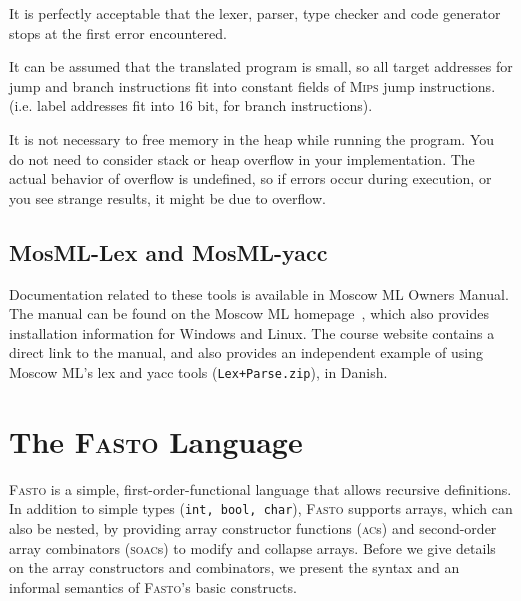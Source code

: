 \documentclass[a4paper,11pt]{article}
\newcommand{\fasto}{\textsc{Fasto}\xspace}
\newcommand{\mips}{\textsc{Mips}\xspace}
\begin{document}
It is perfectly acceptable that the lexer, parser, type checker and code 
generator stops at the first error encountered.

It can be assumed that the translated program is small, so all target addresses 
for jump and branch instructions fit into constant fields of \mips jump instructions.
(i.e. label addresses fit into 16 bit, for branch instructions).

It is not necessary to free memory in the heap while running the program.
You do not need to consider stack or heap overflow in your implementation. 
The actual behavior of overflow is undefined, so if errors occur during execution,
or you see strange results, it might be due to overflow.




\subsection{MosML-Lex and MosML-yacc}

Documentation related to these tools is available in Moscow ML Owners Manual.
The manual can be found on the Moscow ML homepage~\cite{MoscowML}, which 
also provides installation information for Windows and Linux. 
The course website contains a direct link to the manual, and also provides
an independent example of using Moscow ML's lex and yacc tools 
({\tt Lex+Parse.zip}), in Danish. 

\section{The \fasto Language\label{fasto}}
\fasto is a simple, first-order-functional language that allows
recursive definitions. In addition to simple types (\texttt{int, bool, char}),
\fasto supports arrays, which can also be nested, by providing array constructor
functions (\textsc{ac}s) and second-order array combinators (\textsc{soac}s)
to modify and collapse arrays.
%
Before we give details on the array constructors and combinators,
we present the syntax and an informal semantics of \fasto's basic constructs.
\end{document}
